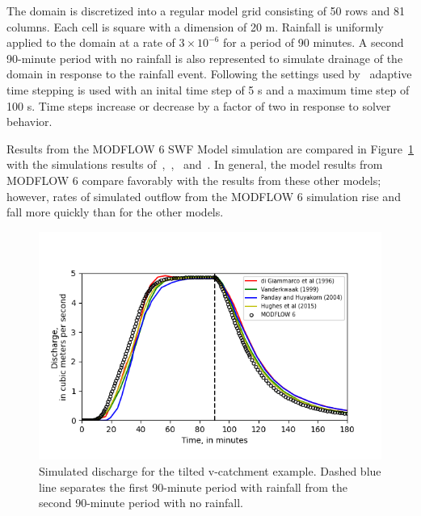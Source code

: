 \documentclass[fleqn]{article}
\begin{document}
The domain is discretized into a regular model grid consisting of 50 rows and 81 columns.  Each cell is square with a dimension of 20 m.  Rainfall is uniformly applied to the domain at a rate of $3 \times 10^{-6}$ for a period of 90 minutes.  A second 90-minute period with no rainfall is also represented to simulate drainage of the domain in response to the rainfall event.  Following the settings used by~\cite{panday2004} adaptive time stepping is used with an inital time step of 5 s and a maximum time step of 100 s.  Time steps increase or decrease by a factor of two in response to solver behavior.

Results from the MODFLOW 6 SWF Model simulation are compared in Figure~\ref{fig:vcatch} with the simulations results of~\cite{digiammarco1996},~\cite{VanderKwaak1999},~\cite{panday2004} and~\cite{hughes2015}.  In general, the model results from MODFLOW 6 compare favorably with the results from these other models; however, rates of simulated outflow from the MODFLOW 6 simulation rise and fall more quickly than for the other models.

\begin{figure}
	\centering
	\includegraphics[scale=0.75]{figures/vcatch-results.png}
	\caption[Simulated discharge for the tilted v-catchment example.]{Simulated discharge for the tilted v-catchment example.  Dashed blue line separates the first 90-minute period with rainfall from the second 90-minute period with no rainfall.}
	\label{fig:vcatch}
\end{figure}

\end{document}
